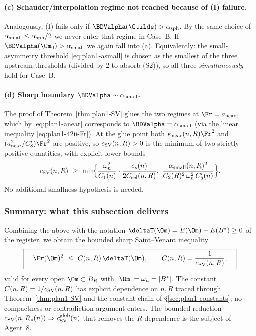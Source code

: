 \paragraph{(c) Schauder/interpolation regime not reached because of (I)
failure.}
Analogously, (I) fails only if $\BDValpha(\Otilde)>\alpha_{\rm sph}$. By
the same choice of $\alpha_{\rm small}\le\alpha_{\rm sph}/2$ we never
enter that regime in Case~B. If $\BDValpha(\Om_{0})>\alpha_{\rm small}$
we again fall into (a). Equivalently: the small-asymmetry threshold
\eqref{eq:plan1-asmall} is chosen as the smallest of the three upstream
thresholds (divided by $2$ to absorb (S2)), so all three
\emph{simultaneously} hold for Case~B.

\paragraph{(d) Sharp boundary $\BDValpha\sim\alpha_{\rm small}$.}
The proof of Theorem~\ref{thm:plan1-SV} glues the two regimes at
$\Fr=a_{\rm near}$, which by \eqref{eq:plan1-anear} corresponds to
$\BDValpha=\alpha_{\rm small}$ (via the linear inequality \eqref{eq:plan1-42ii-Fr}).
At the glue point both
$\kappa_{\rm near}(n,R)\Fr^{2}$ and $(a_{\rm near}^{2}/C_{8}')\Fr^{2}$
are positive, so $c_{\rm SV}(n,R)>0$ is the minimum of two strictly
positive quantities, with explicit lower bounds
\[
   c_{\rm SV}(n,R)\ \ge\
   \min\!\Bigl\{
      \frac{\omega_{n}^{2}}{C_{1}(n)}\cdot\frac{c_{*}(n)}{2C_{\rm sel}(n,R)},\
      \frac{\alpha_{\rm small}(n,R)^{2}}{C_{2}(R)^{2}\,\omega_{n}^{2}\,C_{8}'(n)}
   \Bigr\}.
\]
No additional smallness hypothesis is needed.

\subsubsection{Summary: what this subsection delivers}
\label{sec:plan1-summary}

Combining the above with the notation $\deltaT(\Om)=E(\Om)-E(B^{*})\ge 0$
of the register, we obtain the bounded sharp Saint--Venant inequality
\begin{equation}\label{eq:plan1-final}
   \boxed{\quad
   \Fr(\Om)^{2}\ \le\ C(n,R)\,\deltaT(\Om),
   \qquad
   C(n,R)=\frac{1}{c_{\rm SV}(n,R)},
   \quad}
\end{equation}
valid for every open $\Om\subset B_{R}$ with $|\Om|=\omega_{n}=|B^{*}|$.
The constant $C(n,R)=1/c_{\rm SV}(n,R)$ has explicit dependence on
$n,R$ traced through Theorem~\ref{thm:plan1-SV} and the constant chain
of \S\ref{sec:plan1-constants}; no compactness or contradiction
argument enters. The bounded reduction
$c_{\rm SV}(n,R_{*}(n))\Rightarrow c_{\rm SV}^{\rm glob}(n)$ that removes
the $R$-dependence is the subject of Agent~8.

